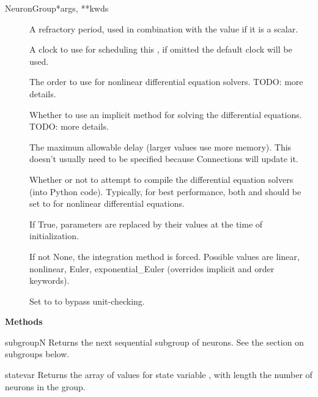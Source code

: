 \documentclass[letterpaper,10pt,english]{manual}
\begin{document}
\begin{classdesc}{NeuronGroup}{*args, **kwds}
\begin{description}
\item[]
A refractory period, used in combination with the  value
if it is a scalar.

\item[]
A clock to use for scheduling this \hyperlink{brian.NeuronGroup}{}, if omitted the
default clock will be used.

\item[]
The order to use for nonlinear differential equation solvers.
TODO: more details.

\item[]
Whether to use an implicit method for solving the differential
equations. TODO: more details.

\item[]
The maximum allowable delay (larger values use more memory).
This doesn't usually need to be specified because Connections will update it.

\item[]
Whether or not to attempt to compile the differential equation
solvers (into Python code). Typically, for best performance, both 
and  should be set to  for nonlinear differential equations.

\item[]
If True, parameters are replaced by their values at the time
of initialization.

\item[]
If not None, the integration method is forced. Possible values are
linear, nonlinear, Euler, exponential\_Euler (overrides implicit and order
keywords).

\item[]
Set to  to bypass unit-checking.

\end{description}

\textbf{Methods}

\hypertarget{brian.NeuronGroup.subgroup}{}\begin{methoddesc}{subgroup}{N}
Returns the next sequential subgroup of  neurons. See
the section on subgroups below.
\end{methoddesc}

\hypertarget{brian.NeuronGroup.state}{}\begin{methoddesc}{state}{var}
Returns the array of values for state
variable , with length the number of neurons in the
group.
\end{methoddesc}


\end{classdesc}
\end{document}
